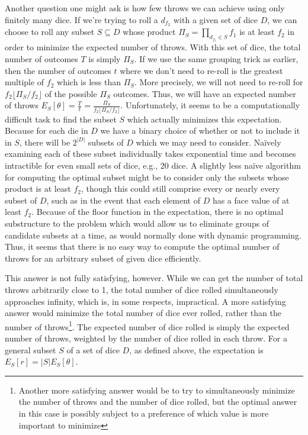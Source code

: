\documentclass{article}
\begin{document}
\par Another question one might ask is how few throws we can achieve using only finitely many dice.
If we're trying to roll a $d_{f_2}$ with a given set of dice $D$, we can choose to roll any subset $S\subseteq D$ whose product $\Pi_S=\prod_{d_{f_1}\in{S}}f_1$ is at least $f_2$ in order to minimize the expected number of throws.
With this set of dice, the total number of outcomes $T$ is simply $\Pi_S$.
If we use the same grouping trick as earlier, then the number of outcomes $t$ where we don't need to re-roll is the greatest multiple of $f_2$ which is less than $\Pi_S$.
More precisely, we will not need to re-roll for $f_2\lfloor \Pi_S/f_2\rfloor$ of the possible $\Pi_S$ outcomes. 
Thus, we will have an expected number of throws $E_S[\theta] = \frac{T}{t} = \frac{\Pi_S}{f_2\lfloor \Pi_S/f_2\rfloor}$.
Unfortunately, it seems to be a computationally difficult task to find the subset $S$ which actually minimizes this expectation.
Because for each die in $D$ we have a binary choice of whether or not to include it in $S$, there will be $2^{|D|}$ subsets of $D$ which we may need to consider.
Na\"ively examining each of these subset individually takes exponential time and becomes intractible for even small sets of dice, e.g., 20 dice.
A slightly less na\"ive algorithm for computing the optimal subset might be to consider only the subsets whose product is at least $f_2$, though this could still comprise every or nearly every subset of $D$, such as in the event that each element of $D$ has a face value of at least $f_2$.
Because of the floor function in the expectation, there is no optimal substructure to the problem which would allow us to eliminate groups of candidate subsets at a time, as would normally done with dynamic programming.
Thus, it seems that there is no easy way to compute the optimal number of throws for an arbitrary subset of given dice efficiently.

\par This answer is not fully satisfying, however.
While we can get the number of total throws arbitrarily close to 1, the total number of dice rolled simultaneously approaches infinity, which is, in some respects, impractical.
A more satisfying answer would minimize the total number of dice ever rolled, rather than the number of throws\footnote{Another more satisfying answer would be to try to simultaneously minimize the number of throws and the number of dice rolled, but the optimal answer in this case is possibly subject to a preference of which value is more important to minimize}.
The expected number of dice rolled is simply the expected number of throws, weighted by the number of dice rolled in each throw.
For a general subset $S$ of a set of dice $D$, as defined above, the expectation is $E_S[r]=|S|E_S[\theta]$.
\end{document}
